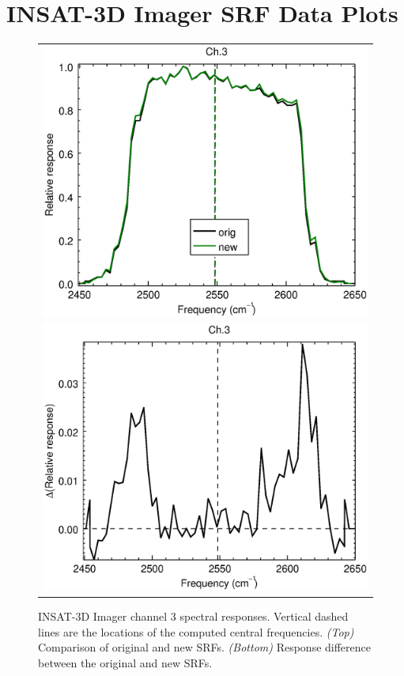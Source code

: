 \section{INSAT-3D Imager SRF Data Plots}
\label{app.imgr_srf_data_plots}

\begin{figure}[H]
  \centering
  \begin{tabular}{c}
    \includegraphics[scale=0.55]{graphics/imgr/srf/imgr_insat3d-3.eps} \\
    \includegraphics[scale=0.55]{graphics/imgr/srf/imgr_insat3d-3.difference.eps}
  \end{tabular}
  \caption{INSAT-3D Imager channel 3 spectral responses. Vertical dashed lines are the locations of the computed central frequencies. \emph{(Top)} Comparison of original and new SRFs. \emph{(Bottom)} Response difference between the original and new SRFs.}
  \label{fig:imgr_ch3}
\end{figure}


